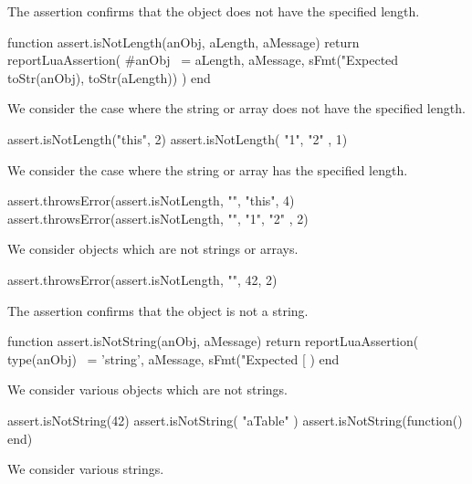 The  assertion confirms that the object does not 
have the specified length. 

\startLuaCode
function assert.isNotLength(anObj, aLength, aMessage)
  return reportLuaAssertion(
    #anObj ~= aLength,
    aMessage,
    sFmt("Expected %
      toStr(anObj), toStr(aLength))
  )
end
\stopLuaCode


We consider the case where the string or array does not have the specified 
length.

\startLuaTest
  assert.isNotLength("this", 2)
  assert.isNotLength({ "1", "2" }, 1)
\stopLuaTest
\stopTestCase


We consider the case where the string or array has the specified length. 

\startLuaTest
  assert.throwsError(assert.isNotLength, "", "this", 4)
  assert.throwsError(assert.isNotLength, "", { "1", "2" }, 2)
\stopLuaTest
\stopTestCase


We consider objects which are not strings or arrays.

\startLuaTest
  assert.throwsError(assert.isNotLength, "", 42, 2)
\stopLuaTest
\stopTestCase

\stopTestSuite


The  assertion confirms that the object is not a 
string. 

\startLuaCode
function assert.isNotString(anObj, aMessage)
  return reportLuaAssertion(
    type(anObj) ~= 'string',
    aMessage,
    sFmt("Expected [%
  )
end
\stopLuaCode


We consider various objects which are not strings.

\startLuaTest
  assert.isNotString(42)
  assert.isNotString({ "aTable" })
  assert.isNotString(function() end)
\stopLuaTest
\stopTestCase


We consider various strings.

